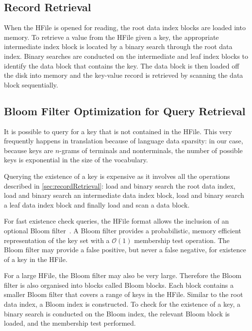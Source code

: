
\subsection{Record Retrieval}
\label{sec:recordRetrieval}

When the HFile is opened for reading, the root data index blocks are loaded into memory.
To retrieve a value from the HFile given a key, the appropriate intermediate
index block is located by a binary search through the root data index. Binary
searches are conducted on the intermediate and leaf index blocks to identify the
data block that contains the key. The data block is then loaded off the disk
into memory and the key-value record is retrieved by scanning the data block
sequentially.

\subsection{Bloom Filter Optimization for Query Retrieval}

It is possible to query for a key that is not contained in the HFile. This very
frequently happens in translation because of language data sparsity: in our case,
because keys are $n$-grams of terminals and nonterminals, the number of possible
keys is exponential in the size of the vocabulary.

Querying
the existence of a key is expensive as it involves all the operations
described in \autoref{sec:recordRetrieval}: load and binary search the root data index,
load and binary search an intermediate data index block, load and binary search
a leaf data index block and finally load and scan a data block.

For fast existence check queries, the HFile format allows
the inclusion of an optional Bloom filter~\citep{bloom:1970:ACM}. A Bloom filter
provides a probabilistic, memory efficient representation of the key set with a
$\mathcal{O}(1)$ membership test operation. The Bloom filter may provide a false
positive, %
but never a false negative, for existence of a key in the HFile.

For a large
HFile, the Bloom filter may also be very large. Therefore the  Bloom filter is
also organised into blocks called Bloom blocks. Each block contains a smaller
Bloom filter that covers a range of keys in the HFile. Similar to the root data
index, a Bloom index is constructed. To check for the
existence of a key, a binary search is conducted on the Bloom index, the
relevant Bloom block is loaded, and the membership test performed.

